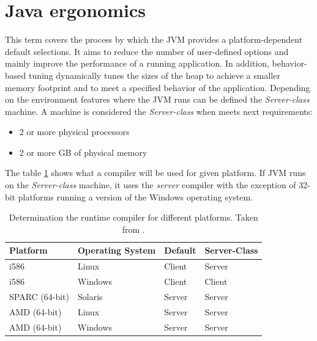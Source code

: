 \documentclass[
  digital, %
  oneside,
  notable, %
  nolof,     %
  nolot     %
]{fithesis3}
\begin{document}
\section{Java ergonomics}\label{secerg}
This term covers the process by which the JVM provides a platform-dependent default selections. It aims to reduce the number of user-defined options and mainly improve the performance of a running application. In addition, behavior-based tuning dynamically tunes the sizes of the heap to achieve a smaller memory footprint and to meet a specified behavior of the application. Depending on the environment features where the JVM runs can be defined the \textit{Server-class} machine. A machine is considered the \textit{Server-class} when meets next requirements:
\begin{itemize}
	\item 2 or more physical processors
	\item 2 or more GB of physical memory
\end{itemize}
The table \ref{figerg} shows what a compiler will be used for given platform. If JVM runs on the \textit{Server-class} machine, it uses the \textit{server} compiler with the exception of 32-bit platforms running a version of the Windows operating system.

\begin{table}[]
	\centering
	\begin{tabular}{|l|l|l|l|}
		\hline
		\textbf{Platform} & \textbf{Operating System} & \textbf{Default} & \textbf{Server-Class} \\ \hline
		i586              & Linux                     & Client           & Server                           \\ \hline
		i586              & Windows                   & Client           & Client                           \\ \hline
		SPARC (64-bit)    & Solaris                   & Server           & Server                           \\ \hline
		AMD (64-bit)      & Linux                     & Server           & Server                           \\ \hline
		AMD (64-bit)      & Windows                   & Server           & Server                           \\ \hline
	\end{tabular}
	\caption{Determination the runtime compiler for different platforms. Taken from \cite{ergonomics}.}
	\label{figerg}
\end{table}
\end{document}
